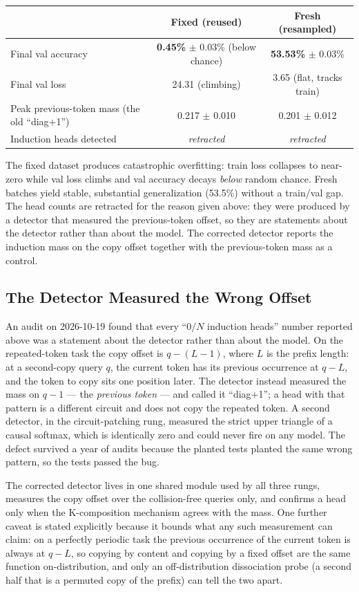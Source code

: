 \documentclass[11pt]{article}
\begin{document}
\begin{center}
\begin{tabular}{lcc}
\toprule
 & Fixed (reused) & Fresh (resampled) \\
\midrule
Final val accuracy & \textbf{0.45\%} $\pm$ 0.03\% (below chance) & \textbf{53.53\%} $\pm$ 0.03\% \\
Final val loss & 24.31 (climbing) & 3.65 (flat, tracks train) \\
Peak previous-token mass (the old ``diag+1'') & 0.217 $\pm$ 0.010 & 0.201 $\pm$ 0.012 \\
Induction heads detected & \emph{retracted} & \emph{retracted} \\
\bottomrule
\end{tabular}
\end{center}

The fixed dataset produces catastrophic overfitting: train loss collapses
to near-zero while val loss climbs and val accuracy decays \emph{below}
random chance. Fresh batches yield stable, substantial generalization
(53.5\%) without a train/val gap. The head counts are retracted for the
reason given above: they were produced by a detector that measured the
previous-token offset, so they are statements about the detector rather
than about the model. The corrected detector reports the induction mass on
the copy offset together with the previous-token mass as a control.

\subsection{The Detector Measured the Wrong Offset}
An audit on 2026-10-19 found that every ``$0 / N$ induction heads'' number
reported above was a statement about the detector rather than about the
model. On the repeated-token task the copy offset is $q-(L-1)$, where $L$
is the prefix length: at a second-copy query $q$, the current token has
its previous occurrence at $q-L$, and the token to copy sits one position
later. The detector instead measured the mass on $q-1$ --- the
\emph{previous token} --- and called it ``diag+1''; a head with that
pattern is a different circuit and does not copy the repeated token. A
second detector, in the circuit-patching rung, measured the strict upper
triangle of a causal softmax, which is identically zero and could never
fire on any model. The defect survived a year of audits because the
planted tests planted the same wrong pattern, so the tests passed the
bug.

The corrected detector lives in one shared module used by all three rungs,
measures the copy offset over the collision-free queries only, and
confirms a head only when the K-composition mechanism agrees with the
mass. One further caveat is stated explicitly because it bounds what any
such measurement can claim: on a perfectly periodic task the previous
occurrence of the current token is always at $q-L$, so copying by content
and copying by a fixed offset are the same function on-distribution, and
only an off-distribution dissociation probe (a second half that is a
permuted copy of the prefix) can tell the two apart.
\end{document}
